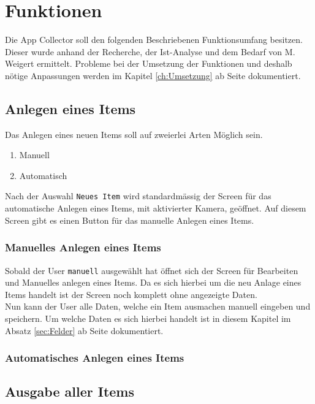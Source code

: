 \section{Funktionen}

Die App Collector soll den folgenden Beschriebenen Funktionsumfang besitzen. Dieser wurde anhand der Recherche, der Ist-Analyse und dem Bedarf von M. Weigert ermittelt. Probleme bei der Umsetzung der Funktionen und deshalb nötige Anpassungen werden im Kapitel \ref{ch:Umsetzung} ab Seite \pageref{ch:Umsetzung} dokumentiert.

\subsection{Anlegen eines Items}

Das Anlegen eines neuen Items soll auf zweierlei Arten Möglich sein.

\begin{enumerate}
	\item Manuell
	\item Automatisch
\end{enumerate}

Nach der Auswahl {\color{IndianRed}\texttt{Neues Item}} wird standardmässig der Screen für das automatische Anlegen eines Items, mit aktivierter Kamera, geöffnet. Auf diesem Screen gibt es einen Button für das manuelle Anlegen eines Items.

\subsubsection{Manuelles Anlegen eines Items}

Sobald der User {\color{IndianRed}\texttt{manuell}} ausgewählt hat öffnet sich der Screen für Bearbeiten und Manuelles anlegen eines Items. Da es sich hierbei um die neu Anlage eines Items handelt ist der Screen noch komplett ohne angezeigte Daten.\\

Nun kann der User alle Daten, welche ein Item ausmachen manuell eingeben und speichern. Um welche Daten es sich hierbei handelt ist in diesem Kapitel im Absatz \ref{sec:Felder} ab Seite \pageref{sec:Felder} dokumentiert.

\subsubsection{Automatisches Anlegen eines Items}

\subsection{Ausgabe aller Items}

